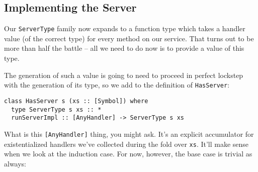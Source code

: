 \subsection{Implementing the Server}


Our \texttt{ServerType} family now expands to a function type which takes a handler value (of the correct type) for every method on our service. That turns out to be more than half the battle -- all we need to do now is to provide a value of this type.

The generation of such a value is going to need to proceed in perfect lockstep with the generation of its type, so we add to the definition of \texttt{HasServer}:

\begin{verbatim}
class HasServer s (xs :: [Symbol]) where
  type ServerType s xs :: *
  runServerImpl :: [AnyHandler] -> ServerType s xs
\end{verbatim}
What is this \texttt{[AnyHandler]} thing, you might ask. It's an explicit accumulator for existentialized handlers we've collected during the fold over \texttt{xs}. It'll make sense when we look at the induction case.
For now, however, the base case is trivial as always:

